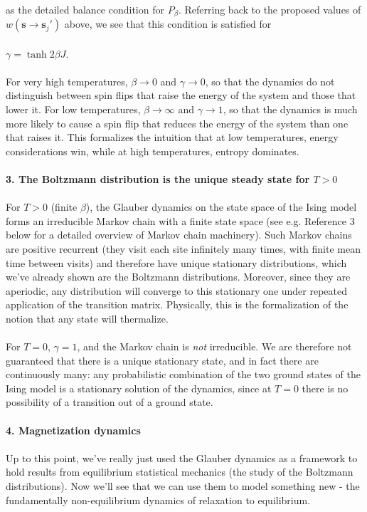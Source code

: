 \documentclass[]{article}
\begin{document}
\\
as the detailed balance condition for $P_\beta$. Referring back to the proposed values of $w(\mathbf{s}\rightarrow\mathbf{s}_j')$ above, we see that this condition is satisfied for\\
\\
$\gamma = \tanh2\beta J$.\\
\\
For very high temperatures, $\beta\rightarrow 0$ and $\gamma\rightarrow 0$, so that the dynamics do not distinguish between spin flips that raise the energy of the system and those that lower it. For low temperatures, $\beta\rightarrow\infty$ and $\gamma\rightarrow 1$, so that the dynamics is much more likely to cause a spin flip that reduces the energy of the system than one that raises it. This formalizes the intuition that at low temperatures, energy considerations win, while at high temperatures, entropy dominates.\\
\\
\textbf{3. The Boltzmann distribution is the unique steady state for $T>0$}\\
\\
For $T>0$ (finite $\beta$), the Glauber dynamics on the state space of the Ising model forms an irreducible Markov chain with a finite state space (see e.g. Reference 3 below for a detailed overview of Markov chain machinery). Such Markov chains are positive recurrent (they visit each site infinitely many times, with finite mean time between visits) and therefore have unique stationary distributions, which we've already shown are the Boltzmann distributions. Moreover, since they are aperiodic, any distribution will converge to this stationary one under repeated application of the transition matrix. Physically, this is the formalization of the notion that any state will thermalize.\\
\\
For $T=0$, $\gamma=1$, and the Markov chain is \textit{not} irreducible. We are therefore not guaranteed that there is a unique stationary state, and in fact there are continuously many: any probabilistic combination of the two ground states of the Ising model is a stationary solution of the dynamics, since at $T=0$ there is no possibility of a transition out of a ground state.\\
\\
\textbf{4. Magnetization dynamics}\\
\\
Up to this point, we've really just used the Glauber dynamics as a framework to hold results from equilibrium statistical mechanics (the study of the Boltzmann distributions). Now we'll see that we can use them to model something new - the fundamentally non-equilibrium dynamics of relaxation to equilibrium.\\
\end{document}
